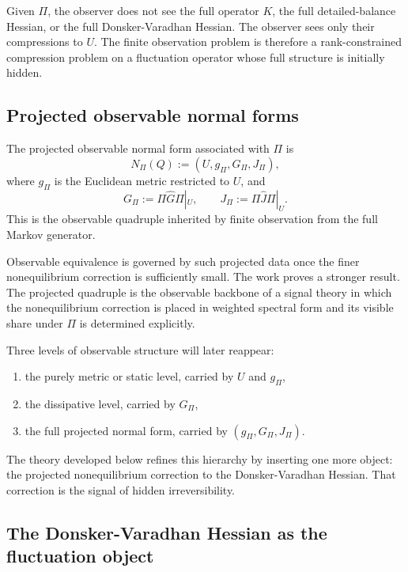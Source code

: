 \documentclass[11pt,a4paper]{article}
\numberwithin{equation}{section}
\theoremstyle{thmcompact}
\theoremstyle{remark}
\begin{document}
Given \(\Pi\), the observer does not see the full operator \(K\), the full detailed-balance Hessian, or the full Donsker-Varadhan Hessian. The observer sees only their compressions to \(U\). The finite observation problem is therefore a rank-constrained compression problem on a fluctuation operator whose full structure is initially hidden.

\subsection{Projected observable normal forms}

The projected observable normal form associated with \(\Pi\) is
\begin{equation}
N_\Pi(Q):=(U,g_\Pi,G_\Pi,J_\Pi),
\end{equation}
where \(g_\Pi\) is the Euclidean metric restricted to \(U\), and
\begin{equation}
G_\Pi:=\Pi \widehat G \Pi|_U,
\qquad
J_\Pi:=\Pi \widehat J \Pi|_U.
\end{equation}
This is the observable quadruple inherited by finite observation from the full Markov generator.

Observable equivalence is governed by such projected data once the finer nonequilibrium correction is sufficiently small. The work proves a stronger result. The projected quadruple is the observable backbone of a signal theory in which the nonequilibrium correction is placed in weighted spectral form and its visible share under \(\Pi\) is determined explicitly.

Three levels of observable structure will later reappear:

\begin{enumerate}
\item the purely metric or static level, carried by \(U\) and \(g_\Pi\),
\item the dissipative level, carried by \(G_\Pi\),
\item the full projected normal form, carried by \((g_\Pi,G_\Pi,J_\Pi)\).
\end{enumerate}

The theory developed below refines this hierarchy by inserting one more object: the projected nonequilibrium correction to the Donsker-Varadhan Hessian. That correction is the signal of hidden irreversibility.

\subsection{The Donsker-Varadhan Hessian as the fluctuation object}
\end{document}
